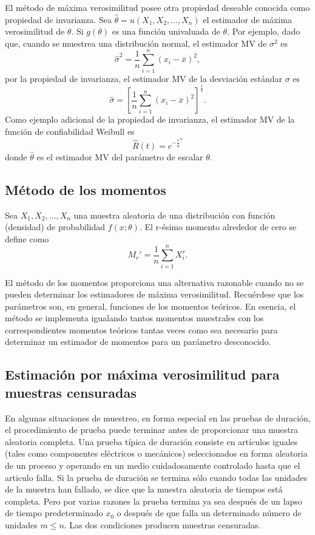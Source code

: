 El método de máxima verosimilitud posee otra propiedad deseable conocida como propiedad de invarianza. Sea $\hat{\theta}=u(X_1,X_2,\ldots,X_n)$ el estimador de máxima verosimilitud de $\theta$. Si $g(\theta)$ es una función univaluada de $\theta$. Por ejemplo, dado que, cuando se muestrea una distribución normal, el estimador MV de $\sigma^2$ es
$$\hat{\sigma}^2 = \dfrac{1}{n}\sum_{i=1}^n \left(x_i-\overline{x}\right)^2,$$
por la propiedad de invarianza, el estimador MV de la desviación estándar $\sigma$ es
$$\hat{\sigma}=\left[\dfrac{1}{n}\sum_{i=1}^n (x_i-\overline{x})^2\right]^{\frac{1}{2}}.$$
Como ejemplo adicional de la propiedad de invarianza, el estimador MV de la función de confiabilidad Weibull es
$$\hat{R}(t)=e^{-\frac{t}{\hat{\theta}}^\alpha}$$
donde $\hat{\theta}$ es el estimador MV del parámetro de escalar $\theta$.


\subsection{Método de los momentos}

\begin{def.}
    Sea $X_1,X_2,\ldots,X_n$ una muestra aleatoria de una distribución con función (densidad) de probabilidad $f(x;\theta)$. El r-ésimo momento alrededor de cero se define como
    $$M_r'=\dfrac{1}{n}\sum_{i=1}^n X_i^r.$$
\end{def.}

El método de los momentos proporciona una alternativa razonable cuando no se pueden determinar los estimadores de máxima verosimilitud. Recuérdese que los parámetros son, en general, funciones de los momentos teóricos. En esencia, el método se implementa igualando tantos momentos muestrales con los correspondientes momentos teóricos tantas veces como sea necesario para determinar un estimador de momentos para un parámetro desconocido.

\subsection{Estimación por máxima verosimilitud para muestras censuradas}
En algunas situaciones de muestreo, en forma especial en las pruebas de duración, el procedimiento de prueba puede terminar antes de proporcionar una muestra aleatoria completa. Una prueba típica de duración consiste en artículos iguales (tales como componentes eléctricos o mecánicos) seleccionados en forma aleatoria de un proceso y operando en un medio cuidadosamente controlado hasta que el articulo falla. Si la prueba de duración se termina sólo cuando todas las unidades de la muestra han fallado, se dice que la muestra aleatoria de tiempos está completa. Pero por varias razones la prueba termina ya sea después de un lapso de tiempo predeterminado $x_0$ o después de que falla un determinado número de unidades $m\leq n$. Las dos condiciones producen muestras censuradas.
